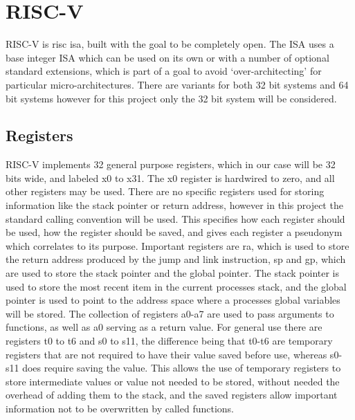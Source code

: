\section{RISC-V}
RISC-V is \ac{risc} \ac{isa}, built with the goal to be completely open. The ISA uses a base integer ISA which can be used on its own or with a number of optional standard extensions, which is part of a goal to avoid `over-architecting' for particular micro-architectures. There are variants for both 32 bit systems and 64 bit systems however for this project only the 32 bit system will be considered.\cite{riscv_unpriv}
\subsection{Registers}
RISC-V implements 32 general purpose registers, which in our case will be 32 bits wide, and labeled x0 to x31. The x0 register is hardwired to zero, and all other registers may be used. There are no specific registers used for storing information like the stack pointer or return address, however in this project the standard calling convention will be used. This specifies how each register should be used, how the register should be saved, and gives each register a pseudonym which correlates to its purpose. Important registers are ra, which is used to store the return address produced by the jump and link instruction, sp and gp, which are used to store the stack pointer and the global pointer. The stack pointer is used to store the most recent item in the current processes stack, and the global pointer is used to point to the address space where a processes global variables will be stored. The collection of registers a0-a7 are used to pass arguments to functions, as well as a0 serving as a return value. For general use there are registers t0 to t6 and s0 to s11, the difference being that t0-t6 are temporary registers that are not required to have their value saved before use, whereas s0-s11 does require saving the value. This allows the use of temporary registers to store intermediate values or value not needed to be stored, without needed the overhead of adding them to the stack, and the saved registers allow important information not to be overwritten by called functions.\cite{riscv_unpriv}
